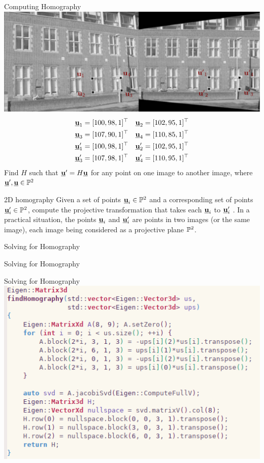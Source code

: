 \documentclass[times,t]{beamer}
\begin{document}
\begin{frame}{Computing Homography}
  \includegraphics[width=\linewidth]{media/removing-perspective-distortion.png.pdf}
  \begin{align*}
    \underline{\mathbf{u}}_1 &= [100, 98, 1]^\top&
    \underline{\mathbf{u}}_2 &= [102, 95, 1]^\top\\
    \underline{\mathbf{u}}_3 &= [107, 90, 1]^\top&
    \underline{\mathbf{u}}_4 &= [110, 85, 1]^\top \\
    \underline{\mathbf{u}}'_1 &= [100, 98, 1]^\top&
    \underline{\mathbf{u}}'_2 &= [102, 95, 1]^\top\\
    \underline{\mathbf{u}}'_3 &= [107, 98, 1]^\top&
    \underline{\mathbf{u}}'_4 &= [110, 95, 1]^\top
  \end{align*}
  Find $H$ such that $\underline{\mathbf{u}}' = H\underline{\mathbf{u}}$ for any point on one image to another
  image, where $\underline{\mathbf{u}}', \underline{\mathbf{u}} \in \mathbb{P}^2$
\end{frame}

\begin{frame}{2D homography}
  Given a set of points $\underline{\mathbf{u}}_i \in \mathbb{P}^2$ and a corresponding set of
  points $\underline{\mathbf{u}}'_i \in \mathbb{P}^2$, compute the projective transformation that takes each
  $\underline{\mathbf{u}}_i$ to $\underline{\mathbf{u}}'_i$ . In a practical situation, the points $\underline{\mathbf{u}}_i$ and   $\underline{\mathbf{u}}'_i$  are points in two images
  (or the same image), each image being considered as a projective plane  $\mathbb{P}^2$.
\end{frame}

\begin{frame}{Solving for Homography }
\end{frame}

\begin{frame}{Solving for Homography }
\end{frame}

\begin{frame}{Solving for Homography }
  \includegraphics[width=\linewidth]{media/homography-code.png}
\end{frame}
\end{document}

